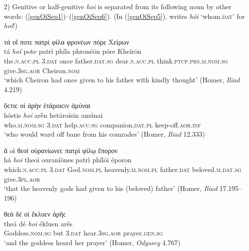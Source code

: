 2) Genitive or half-genitive \emph{hoi} is separated from its following noun by other words: (\ref{genOiSep1})--(\ref{genOiSep6}). (In (\ref{genOiSep5}), \citealp[195]{Herwerden1878} writes \emph{hôi} `whom.\textsc{dat}' for \emph{hoi}!)

\begin{exe}
\ex τά {οἵ} ποτε {πατρὶ} φίλα φρονέων πόρε Χείρων\\
\gll tá \emph{hoí} pote {patrì} phíla phronéōn póre Kheírōn\\
the.\textsc{n.acc.pl} \textsc{3.dat} once father.\textsc{dat.sg} dear.\textsc{n.acc.pl} think.\textsc{ptcp.prs.m.nom.sg} give.\textsc{3sg.aor} Cheiron.\textsc{nom}\\
\trans `which Cheiron had once given to his father with kindly thought' (Homer, \emph{Iliad} 4.219)
\label{genOiSep1}
\end{exe}

\begin{exe}
\ex ὅϲτιϲ {οἱ} ἀρὴν {ἑτάροιϲιν} ἀμύναι\\
\gll hóstis \emph{hoi} arḕn hetároisin amúnai\\
who.\textsc{m.nom.sg} \textsc{3.dat} help.\textsc{acc.sg} companion.\textsc{dat.pl} keep-off.\textsc{aor.inf}\\
\trans `who would ward off bane from his comrades' (Homer, \emph{Iliad} 12.333)
\label{genOiSep2}
\end{exe}

\begin{exe}
\ex ἅ {oἱ} θεοὶ οὐρανίωνεϲ {πατρὶ} φίλῳ ἔπορον\\
\gll há \emph{hoi} theoì ouraníōnes {patrì} phílōi époron\\
which.\textsc{n.acc.pl} \textsc{3.dat} God.\textsc{nom.pl} heavenly.\textsc{m.nom.pl} father.\textsc{dat} beloved.\textsc{m.dat.sg} give.\textsc{3pl.aor}\\
\trans `that the heavenly gods had given to his (beloved) father' (Homer, \emph{Iliad} 17.195--196)
\label{genOiSep3}
\end{exe}

\begin{exe}
\ex θεὰ δέ {οἱ} ἔκλυεν {ἀρῆϲ}\\
\gll theà dé \emph{hoi} ékluen arês\\
Goddess.\textsc{nom.sg} but \textsc{3.dat} hear.\textsc{3sg.aor} prayer.\textsc{gen.sg}\\
\trans `and the goddess heard her prayer' (Homer, \emph{Odyssey} 4.767)
\label{genOiSep4}
\end{exe}

